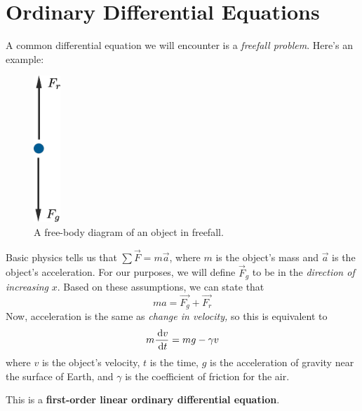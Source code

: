 \chapter{Ordinary Differential Equations}

A common differential equation we will encounter is a \emph{freefall problem}.
Here's an example:

\begin{figure}[H]
  \begin{center}
    \includegraphics[width=1cm]{continuous/ode/freefall.eps}
  \end{center}
  \caption{A free-body diagram of an object in freefall.}
  \label{fig:freefall}
\end{figure}

Basic physics tells us that $\sum \vec F = m\vec a$,
where $m$ is the object's mass and $\vec{a}$ is the object's acceleration.
For our purposes, we will define $\vec F_g$ to be in the \emph{direction of increasing} $x$.
Based on these assumptions, we can state that
\[
  ma=\vec{F_g}+\vec{F_r}
  \]
Now, acceleration is the same as \emph{change in velocity,} so this is equivalent to
\[
  m\frac{\,\mathrm{d} v}{\,\mathrm{d} t}=mg - \gamma v
  \]
where $v$ is the object's velocity, $t$ is the time, $g$ is the acceleration of gravity near the surface of Earth, and $\gamma$ is the coefficient of friction for the air.

This is a \textbf{first-order linear ordinary differential equation}.

